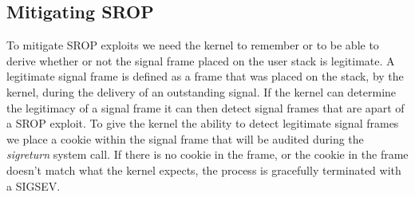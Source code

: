\documentclass{sig-alternate-05-2015}
\begin{document}
\subsection{Mitigating SROP}
To mitigate SROP exploits we need the kernel to remember or to be able to derive whether or not the signal frame placed on the user stack is legitimate. A legitimate signal frame is defined as a frame that was placed on the stack, by the kernel, during the delivery of an outstanding signal. If the kernel can determine the legitimacy of a signal frame it can then detect signal frames that are apart of a SROP exploit. To give the kernel the ability to detect legitimate signal frames we place a cookie within the signal frame that will be audited during the \textit{sigreturn} system call. If there is no cookie in the frame, or the cookie in the frame doesn't match what the kernel expects, the process is gracefully terminated with a SIGSEV.
\end{document}
